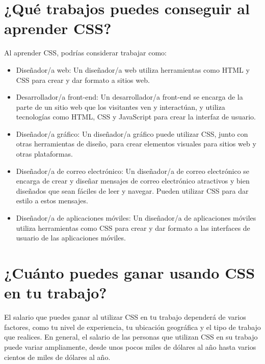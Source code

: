 \documentclass{article}
\begin{document}
\section{¿Qué trabajos puedes conseguir al aprender CSS?}
Al aprender CSS, podrías considerar trabajar como:
\begin{itemize}
	\item Diseñador/a web: Un diseñador/a web utiliza herramientas como HTML y CSS para crear y dar formato a sitios web.
	\item Desarrollador/a front-end: Un desarrollador/a front-end se encarga de la parte de un sitio web que los visitantes ven y interactúan, y utiliza tecnologías como HTML, CSS y JavaScript para crear la interfaz de usuario.
	\item Diseñador/a gráfico: Un diseñador/a gráfico puede utilizar CSS, junto con otras herramientas de diseño, para crear elementos visuales para sitios web y otras plataformas.
	\item Diseñador/a de correo electrónico: Un diseñador/a de correo electrónico se encarga de crear y diseñar mensajes de correo electrónico atractivos y bien diseñados que sean fáciles de leer y navegar. Pueden utilizar CSS para dar estilo a estos mensajes.
	\item Diseñador/a de aplicaciones móviles: Un diseñador/a de aplicaciones móviles utiliza herramientas como CSS para crear y dar formato a las interfaces de usuario de las aplicaciones móviles.
\end{itemize}

\section{¿Cuánto puedes ganar usando CSS en tu trabajo?}
El salario que puedes ganar al utilizar CSS en tu trabajo dependerá de varios factores, como tu nivel de experiencia, tu ubicación geográfica y el tipo de trabajo que realices. En general, el salario de las personas que utilizan CSS en su trabajo puede variar ampliamente, desde unos pocos miles de dólares al año hasta varios cientos de miles de dólares al año.
\end{document}
